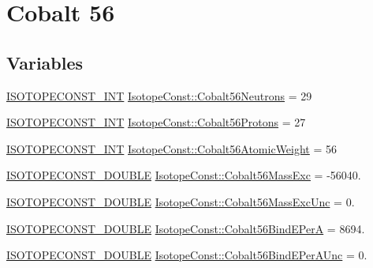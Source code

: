 \hypertarget{group___isotope_const-_cobalt-_co56}{}\section{Cobalt 56}
\label{group___isotope_const-_cobalt-_co56}
\subsection*{Variables}
\begin{DoxyCompactItemize}
\item 
\mbox{\hyperlink{group___isotope_const-_macros_ga5f18360b3e99483a35c32d789e62621c}{I\+S\+O\+T\+O\+P\+E\+C\+O\+N\+S\+T\+\_\+\+I\+NT}} \mbox{\hyperlink{group___isotope_const-_cobalt-_co56_gaf5da984179119aac013dfe4b53dc0d05}{Isotope\+Const\+::\+Cobalt56\+Neutrons}} = 29
\item 
\mbox{\hyperlink{group___isotope_const-_macros_ga5f18360b3e99483a35c32d789e62621c}{I\+S\+O\+T\+O\+P\+E\+C\+O\+N\+S\+T\+\_\+\+I\+NT}} \mbox{\hyperlink{group___isotope_const-_cobalt-_co56_ga3c0c6952e9499ea9d2560b2a66e2d339}{Isotope\+Const\+::\+Cobalt56\+Protons}} = 27
\item 
\mbox{\hyperlink{group___isotope_const-_macros_ga5f18360b3e99483a35c32d789e62621c}{I\+S\+O\+T\+O\+P\+E\+C\+O\+N\+S\+T\+\_\+\+I\+NT}} \mbox{\hyperlink{group___isotope_const-_cobalt-_co56_ga3b07078a9af4877a163145eddf6e2592}{Isotope\+Const\+::\+Cobalt56\+Atomic\+Weight}} = 56
\item 
\mbox{\hyperlink{group___isotope_const-_macros_ga8f45a7272ce02c0b4c65c44636ed719a}{I\+S\+O\+T\+O\+P\+E\+C\+O\+N\+S\+T\+\_\+\+D\+O\+U\+B\+LE}} \mbox{\hyperlink{group___isotope_const-_cobalt-_co56_ga0fb9e3687806ad9c95bfd5e56f116b0c}{Isotope\+Const\+::\+Cobalt56\+Mass\+Exc}} = -\/56040.
\item 
\mbox{\hyperlink{group___isotope_const-_macros_ga8f45a7272ce02c0b4c65c44636ed719a}{I\+S\+O\+T\+O\+P\+E\+C\+O\+N\+S\+T\+\_\+\+D\+O\+U\+B\+LE}} \mbox{\hyperlink{group___isotope_const-_cobalt-_co56_ga8ac1957c0cdd7336de5a64be430120e1}{Isotope\+Const\+::\+Cobalt56\+Mass\+Exc\+Unc}} = 0.
\item 
\mbox{\hyperlink{group___isotope_const-_macros_ga8f45a7272ce02c0b4c65c44636ed719a}{I\+S\+O\+T\+O\+P\+E\+C\+O\+N\+S\+T\+\_\+\+D\+O\+U\+B\+LE}} \mbox{\hyperlink{group___isotope_const-_cobalt-_co56_gab607223d5e5447b8cdd9116bdfaf0af0}{Isotope\+Const\+::\+Cobalt56\+Bind\+E\+PerA}} = 8694.
\item 
\mbox{\hyperlink{group___isotope_const-_macros_ga8f45a7272ce02c0b4c65c44636ed719a}{I\+S\+O\+T\+O\+P\+E\+C\+O\+N\+S\+T\+\_\+\+D\+O\+U\+B\+LE}} \mbox{\hyperlink{group___isotope_const-_cobalt-_co56_ga2487437f086e96d53264cd618eda0f07}{Isotope\+Const\+::\+Cobalt56\+Bind\+E\+Per\+A\+Unc}} = 0.

\end{DoxyCompactItemize}
